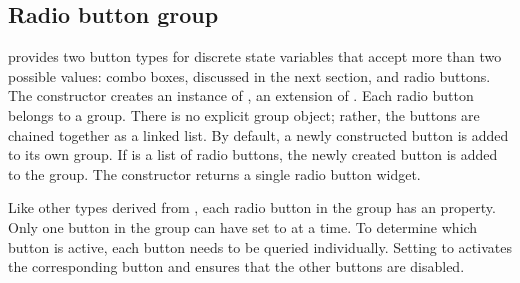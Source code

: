 \subsection{Radio button group}
\label{sec:RGtk2:gtkRadioButton}

\GTK\/ provides two button types for discrete state variables that
accept more than two possible values: combo boxes, discussed in the
next section, and radio buttons. The 
constructor creates an instance of , an
extension of . Each radio button belongs to a
group.  There is no explicit group object; rather, the buttons are
chained together as a linked list. By default, a newly constructed
button is added to its own group. If 
is a list of radio buttons, the newly created button is added to the
group. The constructor returns a single radio button widget.

Like other types derived from , each radio
button in the group has an  property.  Only one button in
the group can have  set to  at a time. To
determine which button is active, each button needs to be queried
individually. Setting  to  activates the
corresponding button and ensures that the other buttons are disabled.

